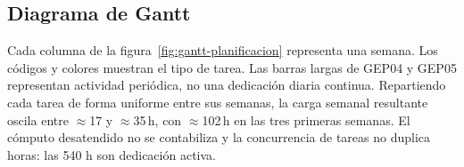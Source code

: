 \thispagestyle{plain}
\clearpage
\begin{landscape}
\section{Diagrama de Gantt}

Cada columna de la figura~\ref{fig:gantt-planificacion} representa una semana.
Los códigos y colores muestran el tipo de tarea. Las barras largas de GEP04 y
GEP05 representan actividad periódica, no una dedicación diaria continua. Repartiendo cada tarea de forma
uniforme entre sus semanas, la carga semanal resultante oscila entre $\approx$17 y
$\approx$35\,h, con $\approx$102\,h en las tres primeras semanas. El cómputo desatendido
no se contabiliza y la concurrencia de tareas no duplica horas: las 540 h son
dedicación activa.


\end{landscape}
